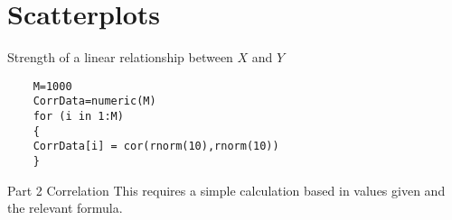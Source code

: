 \documentclass[]{report}
\begin{document}

%


\section{Scatterplots}





Strength of a linear relationship between $X$ and $Y$

\begin{framed}
	\begin{verbatim}
	M=1000
	CorrData=numeric(M)
	for (i in 1:M)
	{
	CorrData[i] = cor(rnorm(10),rnorm(10))
	}
	\end{verbatim}
\end{framed}



Part 2 Correlation
This requires a simple calculation based in values given and the relevant formula.



	
\end{document}
